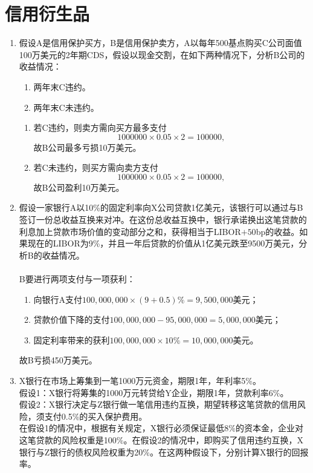\section{信用衍生品}
\begin{enumerate}
    \item 假设A是信用保护买方，B是信用保护卖方，A以每年500基点购买C公司面值100万美元的2年期CDS，假设以现金交割，在如下两种情况下，分析B公司的收益情况：
    \begin{enumerate}[label=(\arabic*)]
        \item 两年末C违约。
        \item 两年末C未违约。
    \end{enumerate}
    \sol
    \begin{enumerate}[label=(\arabic*)]
        \item 若C违约，则卖方需向买方最多支付
        \[1000000 \times 0.05 \times 2 = 100000,\]
        故B公司最多亏损10万美元。
        \item 若C未违约，则买方需向卖方支付
        \[1000000 \times 0.05 \times 2 = 100000,\]
        故B公司盈利10万美元。
    \end{enumerate}
    \item 假设一家银行A以10\%的固定利率向X公司贷款1亿美元，该银行可以通过与B签订一份总收益互换来对冲。在这份总收益互换中，银行承诺换出这笔贷款的利息加上贷款市场价值的变动部分之和，获得相当于LIBOR$+50$bp的收益。如果现在的LIBOR为9\%，并且一年后贷款的价值从1亿美元跌至9500万美元，分析B的收益情况。\\
    \sol\\
    B要进行两项支付与一项获利：
    \begin{enumerate}[label=(\arabic*)]
        \item 向银行A支付$100,000,000 \times (9 + 0.5)\% = 9,500,000$美元；
        \item 贷款价值下降的支付$100,000,000 - 95,000,000 = 5,000,000$美元；
        \item 固定利率带来的获利$100,000,000 \times 10\% = 10,000,000$美元。
    \end{enumerate}
    故B亏损450万美元。
    \item X银行在市场上筹集到一笔1000万元资金，期限1年，年利率5\%。\\
    假设1：X银行将筹集的1000万元转贷给Y企业，期限1年，贷款利率6\%。\\
    假设2：X银行决定与Z银行做一笔信用违约互换，期望转移这笔贷款的信用风险，须支付0.5\%的买入保护费用。\\
    在假设1的情况中，根据有关规定，X银行必须保证最低8\%的资本金，企业对这笔贷款的风险权重是100\%。在假设2的情况中，即购买了信用违约互换，X银行与Z银行的债权风险权重为20\%。在这两种假设下，分别计算X银行的回报率。\\

\end{enumerate}
